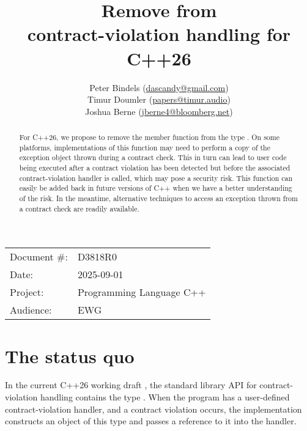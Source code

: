 

 \usepackage[bottom]{footmisc} 



\title{Remove  from \\ contract-violation handling for C++26}
\author{
  Peter Bindels \small(\href{mailto:dascandy@gmail.com}{dascandy@gmail.com}) \\
  Timur Doumler \small(\href{mailto:papers@timur.audio}{papers@timur.audio}) \\
  Joshua Berne \small(\href{mailto:jberne4@bloomberg.net}{jberne4@bloomberg.net}) \\
}
\date{}
\maketitle

\begin{tabular}{ll}
Document \#: & D3818R0 \\
Date: &2025-09-01 \\
Project: & Programming Language C++ \\
Audience: & EWG
\end{tabular}

\begin{abstract}
For C++26, we propose to remove the member function  from the type . On some platforms, implementations of this function may need to perform a copy of the exception object thrown during a contract check. This in turn can lead to user code being executed after a contract violation has been detected but before the associated contract-violation handler is called, which may pose a security risk.  This function can easily be added back in future versions of C++ when we have a better understanding of the risk. In the meantime, alternative techniques to access an exception thrown from a contract check are readily available.
\end{abstract}


\section{The status quo}

In the current C++26 working draft \cite{N5014}, the standard library API for contract-violation handling contains the type . When the program has a user-defined contract-violation handler, and a contract violation occurs, the implementation constructs an object of this type and passes a reference to it into the handler.

